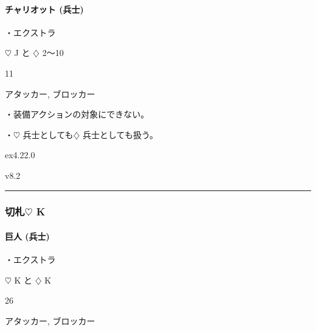 \documentclass[letterpaper,10pt,dvipdfmx]{sphinxmanual}
\begin{document}
\paragraph{チャリオット (兵士)}
\label{\detokenize{auto/frameActionlist:char-chariot}}\label{\detokenize{auto/frameActionlist:id96}}
\sphinxAtStartPar
{}

\sphinxAtStartPar
・エクストラ

\sphinxAtStartPar
{} {\normalsize $\heartsuit$} J と {\normalsize $\diamondsuit$} 2〜10

\sphinxAtStartPar
{} 11

\sphinxAtStartPar
{} アタッカー, ブロッカー

\sphinxAtStartPar
{}

\sphinxAtStartPar
・装備アクションの対象にできない。

\sphinxAtStartPar
・{\normalsize $\heartsuit$} 兵士としても{\normalsize $\diamondsuit$} 兵士としても扱う。

\sphinxAtStartPar
{}  ex4.22.0

\sphinxAtStartPar
{}  v8.2


\bigskip\hrule\bigskip



\subsubsection{切札{\normalsize $\heartsuit$} K}
\label{\detokenize{auto/frameActionlist:id97}}

\paragraph{巨人 (兵士)}
\label{\detokenize{auto/frameActionlist:char-giant}}\label{\detokenize{auto/frameActionlist:id98}}
\sphinxAtStartPar
{}

\sphinxAtStartPar
・エクストラ

\sphinxAtStartPar
{} {\normalsize $\heartsuit$} K と {\normalsize $\diamondsuit$} K

\sphinxAtStartPar
{} 26

\sphinxAtStartPar
{} アタッカー, ブロッカー

\sphinxAtStartPar
{}
\end{document}
